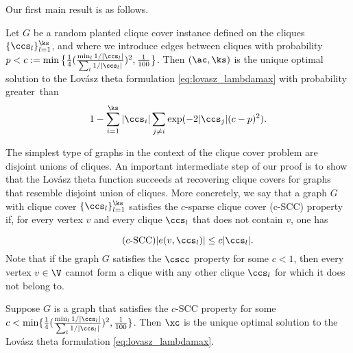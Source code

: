 Our first main result is as follows.

\begin{result} \label{thm:result1}
Let $G$ be a random planted clique cover instance  defined on the cliques $\{ \ccs_l \}_{l=1}^{\ks}$, and where we introduce edges between cliques with probability $p < c:= \min \big\{ \frac{1}{4} (\frac{\min_l 1/|\ccs_l|}{\sum_l 1/|\ccs_l|})^2,{ 1\over 100 }\big\}$.  Then $(\ac,\ks)$ is the unique optimal solution to  the Lov\'asz theta formulation \eqref{eq:lovasz_lambdamax} with probability greater~than 
$$1 - \sum_{i=1}^{\ks} {|\ccs_i| \sum_{j \neq i}\exp(-2|\ccs_j|(c-p)^2}).
$$
\end{result}
The simplest type of graphs in the context of the clique cover problem  are disjoint unions of cliques.  An important intermediate step of our proof is to show that the Lov\'asz theta function succeeds at recovering clique covers for graphs that resemble disjoint union of cliques.  More concretely, we say that a graph $G$ with clique cover $\{ \ccs_l \}_{l=1}^{\ks}$ satisfies the $c$-sparse clique cover (c-SCC) property if, for every vertex $v$ and every clique $\ccs_l$ that does not contain $v$, one has

\begin{equation} \label{eq:neighborcondition}\tag{$c$-SCC}
|e(v, \ccs_l)| \leq c | \ccs_l|. %
\end{equation}
Note that if the graph $G$ satisfies the $\cscc$ property for some $c<1$, then every vertex $v \in \V$ cannot form a clique with any other clique $\ccs_l$ for which it does not belong to.

\begin{result} \label{thm:result2}
Suppose $G$ is a graph that satisfies the $c$-SCC property for some 
$c < \min \{ \frac{1}{4} (\frac{\min_l 1/|\ccs_l|}{\sum_l 1/|\ccs_l|})^2,\frac{1}{100} \}$.  Then $\xc$ is the unique optimal solution to the Lov\'asz theta formulation \eqref{eq:lovasz_lambdamax}.
\end{result}

